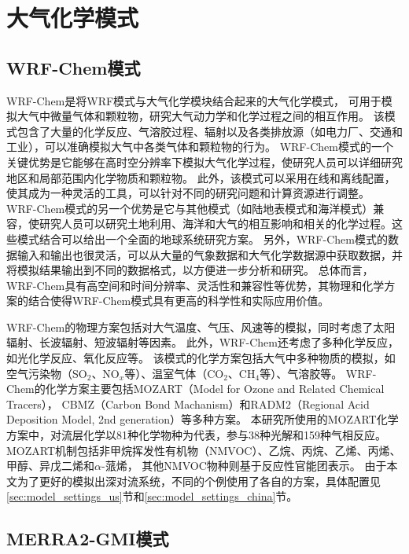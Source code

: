 \section{大气化学模式}

\subsection{WRF-Chem模式}

WRF-Chem是将WRF模式与大气化学模块结合起来的大气化学模式，
可用于模拟大气中微量气体和颗粒物，研究大气动力学和化学过程之间的相互作用。
该模式包含了大量的化学反应、气溶胶过程、辐射以及各类排放源（如电力厂、交通和工业），可以准确模拟大气中各类气体和颗粒物的行为。
WRF-Chem模式的一个关键优势是它能够在高时空分辨率下模拟大气化学过程，使研究人员可以详细研究地区和局部范围内化学物质和颗粒物。
此外，该模式可以采用在线和离线配置，使其成为一种灵活的工具，可以针对不同的研究问题和计算资源进行调整。
WRF-Chem模式的另一个优势是它与其他模式（如陆地表模式和海洋模式）兼容，使研究人员可以研究土地利用、海洋和大气的相互影响和相关的化学过程。这些模式结合可以给出一个全面的地球系统研究方案。
另外，WRF-Chem模式的数据输入和输出也很灵活，可以从大量的气象数据和大气化学数据源中获取数据，并将模拟结果输出到不同的数据格式，以方便进一步分析和研究。
总体而言，WRF-Chem具有高空间和时间分辨率、灵活性和兼容性等优势，其物理和化学方案的结合使得WRF-Chem模式具有更高的科学性和实际应用价值。

WRF-Chem的物理方案包括对大气温度、气压、风速等的模拟，同时考虑了太阳辐射、长波辐射、短波辐射等因素。
此外，WRF-Chem还考虑了多种化学反应，如光化学反应、氧化反应等。
该模式的化学方案包括大气中多种物质的模拟，如空气污染物（SO$_2$、NO$_x$等）、温室气体（CO$_2$、CH$_4$等）、气溶胶等。
WRF-Chem的化学方案主要包括MOZART（Model for Ozone and Related Chemical Tracers），
CBMZ（Carbon Bond Machanism）和RADM2（Regional Acid Deposition Model, 2nd generation）等多种方案。
本研究所使用的MOZART化学方案中，对流层化学以81种化学物种为代表，参与38种光解和159种气相反应\citep{Emmons.2010}。
MOZART机制包括非甲烷挥发性有机物（NMVOC）、乙烷、丙烷、乙烯、丙烯、甲醇、异戊二烯和$\alpha$-蒎烯，
其他NMVOC物种则基于反应性官能团表示。
由于本文为了更好的模拟出深对流系统，不同的个例使用了各自的方案，具体配置见\ref{sec:model_settings_us}节和\ref{sec:model_settings_china}节。



\subsection{MERRA2-GMI模式}

